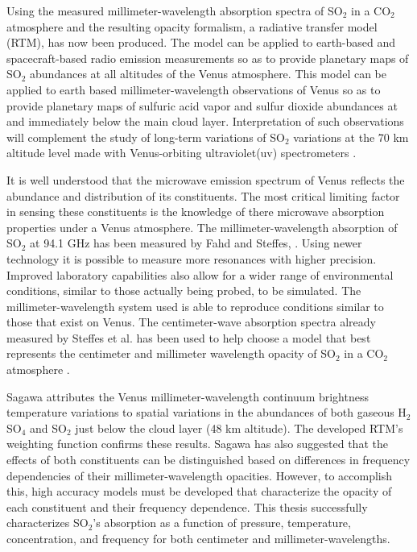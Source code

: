 Using the measured millimeter-wavelength absorption spectra of SO$_2$ in a CO$_2$ atmosphere and the resulting opacity formalism, a radiative transfer model (RTM), has now been produced. The model can be applied to earth-based and spacecraft-based radio emission measurements so as to provide planetary maps of SO$_2$ abundances at all altitudes of the Venus atmosphere. %
This model can be applied to earth based millimeter-wavelength observations of Venus so as to provide planetary maps of sulfuric acid vapor and sulfur dioxide abundances at and immediately below the main cloud layer. Interpretation of such observations will complement the study of long-term variations of SO$_2$ variations at the 70 km altitude level made with Venus-orbiting ultraviolet(uv) spectrometers \cite{Esposito-2012}. 

It is well understood that the microwave emission spectrum of Venus reflects the abundance and distribution of its constituents. The most critical limiting factor in sensing these constituents is the knowledge of there microwave absorption properties under a Venus atmosphere. 
The millimeter-wavelength absorption of SO$_2$ at 94.1 GHz has been measured by Fahd and Steffes, \cite{Fahd-thesis}. 
Using newer technology it is possible to measure more resonances with higher precision. Improved laboratory capabilities also allow for a wider range of environmental conditions, similar to those actually being probed, to be simulated. The millimeter-wavelength system used is able to reproduce conditions similar to those that exist on Venus. The centimeter-wave absorption spectra already measured by Steffes et al. \cite{Steffes-2014} has been used to help choose a model that best represents the centimeter and millimeter wavelength opacity of SO$_2$ in a CO$_2$ atmosphere \cite{Butler-2001}. 

Sagawa \cite{Sagawa-2008} attributes the Venus millimeter-wavelength continuum brightness temperature variations to spatial variations in the abundances of both gaseous H$_2$SO$_4$ and SO$_2$ just below the cloud layer (48 km altitude). The developed RTM's weighting function confirms these results. Sagawa has also suggested that the effects of both constituents can be distinguished based on differences in frequency dependencies of their millimeter-wavelength opacities. However, to accomplish this, high accuracy models must be developed that characterize the opacity of each constituent and their frequency dependence. This thesis successfully characterizes SO$_2$'s absorption as a function of pressure, temperature, concentration, and frequency for both centimeter and millimeter-wavelengths. 


